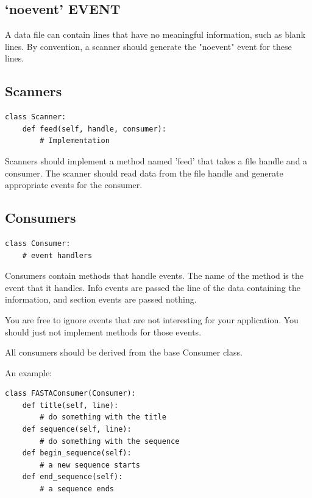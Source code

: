 \documentclass{report}
\begin{document}
\subsection{`noevent' EVENT}

A data file can contain lines that have no meaningful information,
such as blank lines.  By convention, a scanner should generate the
"noevent" event for these lines.




\subsection{Scanners}

\begin{verbatim}
class Scanner:
    def feed(self, handle, consumer):
        # Implementation
\end{verbatim}


Scanners should implement a method named 'feed' that takes a file
handle and a consumer.  The scanner should read data from the file
handle and generate appropriate events for the consumer.

\subsection{Consumers}

\begin{verbatim}
class Consumer:
    # event handlers
\end{verbatim}


Consumers contain methods that handle events.  The name of the method
is the event that it handles.  Info events are passed the line of the
data containing the information, and section events are passed
nothing.


You are free to ignore events that are not interesting for your
application.  You should just not implement methods for those events.


All consumers should be derived from the base Consumer class.


An example:


\begin{verbatim}
class FASTAConsumer(Consumer):
    def title(self, line):
        # do something with the title
    def sequence(self, line):
        # do something with the sequence
    def begin_sequence(self):
        # a new sequence starts
    def end_sequence(self):
        # a sequence ends
\end{verbatim}
\end{document}
